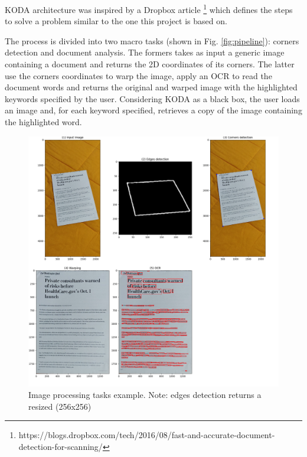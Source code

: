 \documentclass[a4paper]{article}
\begin{document}
KODA architecture was inspired by a Dropbox article \footnote{https://blogs.dropbox.com/tech/2016/08/fast-and-accurate-document-detection-for-scanning/} which defines the steps to solve a problem similar to the one this project is based on.

The process is divided into two macro tasks (shown in Fig. \ref{fig:pipeline}): corners detection and document analysis. The formers takes as input a generic image containing a document and returns the 2D coordinates of its corners. The latter use the corners coordinates to warp the image, apply an OCR to read the document words and returns the original and warped image with the highlighted keywords specified by the user. Considering KODA as a black box, the user loads an image and, for each keyword specified, retrieves a copy of the image containing the highlighted word.

\begin{figure}[!htbp]
	\includegraphics[width=\linewidth]{ipt.png}
	\caption{Image processing tasks example. Note: edges detection returns a resized (256x256)}
	\label{fig:imageprocessing}
\end{figure}
\end{document}
